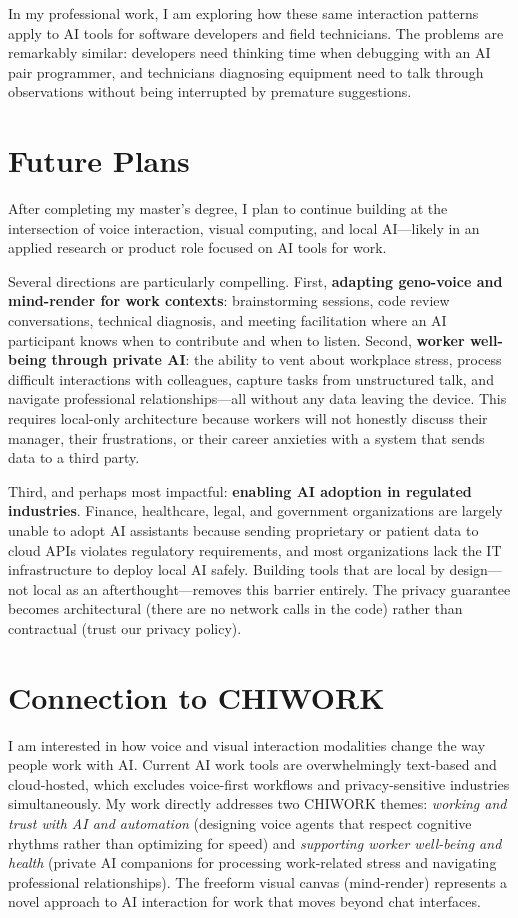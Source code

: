\documentclass[manuscript,anonymous=false]{acmart}
\begin{document}
In my professional work, I am exploring how these same interaction patterns apply to AI tools for software developers and field technicians. The problems are remarkably similar: developers need thinking time when debugging with an AI pair programmer, and technicians diagnosing equipment need to talk through observations without being interrupted by premature suggestions.

\section{Future Plans}

After completing my master's degree, I plan to continue building at the intersection of voice interaction, visual computing, and local AI---likely in an applied research or product role focused on AI tools for work.

Several directions are particularly compelling. First, \textbf{adapting geno-voice and mind-render for work contexts}: brainstorming sessions, code review conversations, technical diagnosis, and meeting facilitation where an AI participant knows when to contribute and when to listen. Second, \textbf{worker well-being through private AI}: the ability to vent about workplace stress, process difficult interactions with colleagues, capture tasks from unstructured talk, and navigate professional relationships---all without any data leaving the device. This requires local-only architecture because workers will not honestly discuss their manager, their frustrations, or their career anxieties with a system that sends data to a third party.

Third, and perhaps most impactful: \textbf{enabling AI adoption in regulated industries}. Finance, healthcare, legal, and government organizations are largely unable to adopt AI assistants because sending proprietary or patient data to cloud APIs violates regulatory requirements, and most organizations lack the IT infrastructure to deploy local AI safely. Building tools that are local by design---not local as an afterthought---removes this barrier entirely. The privacy guarantee becomes architectural (there are no network calls in the code) rather than contractual (trust our privacy policy).

\section*{Connection to CHIWORK}

I am interested in how voice and visual interaction modalities change the way people work with AI. Current AI work tools are overwhelmingly text-based and cloud-hosted, which excludes voice-first workflows and privacy-sensitive industries simultaneously. My work directly addresses two CHIWORK themes: \emph{working and trust with AI and automation} (designing voice agents that respect cognitive rhythms rather than optimizing for speed) and \emph{supporting worker well-being and health} (private AI companions for processing work-related stress and navigating professional relationships). The freeform visual canvas (mind-render) represents a novel approach to AI interaction for work that moves beyond chat interfaces.
\end{document}
